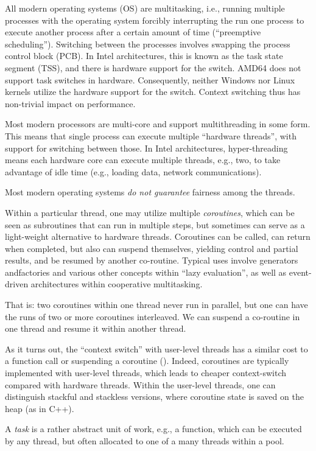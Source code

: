 All modern operating systems (OS) are multitasking, i.e., running multiple processes with the operating system forcibly interrupting the run one process to execute another process after a certain amount of time (``preemptive scheduling''). Switching between the processes involves swapping the process control block (PCB). In Intel architectures, this is known as the task state segment (TSS), and there is hardware support for the switch. AMD64 does not support task switches in hardware.
Consequently, neither Windows nor Linux kernels utilize the hardware support for the switch.
Context switching thus has non-trivial impact on performance. 

Most modern processors are multi-core and support multithreading in some form. This means that single process can execute multiple ``hardware threads'', with support for switching between those. In Intel architectures, hyper-threading means each hardware core can execute multiple threads, e.g., two, to take advantage of idle time (e.g., loading data, network communications).  

Most modern operating systems \emph{do not guarantee} fairness among the threads. 

Within a particular thread, one may utilize multiple \emph{coroutines}, which can be seen as subroutines that can run in multiple steps, but sometimes can serve as a light-weight alternative to hardware threads. Coroutines can be called, can return when completed, but also can suspend themselves, yielding control and partial results, and be resumed by another co-routine. Typical uses involve generators andfactories and various other concepts within ``lazy evaluation'', as well as event-driven architectures within cooperative multitasking. 

That is: two coroutines within one thread never run in parallel, but one can have the runs of two or more coroutines interleaved. We can suspend a co-routine in one thread and resume it within another thread. 

As it turns out, the ``context switch'' with user-level threads has a similar cost to a function call or suspending a coroutine (). Indeed, coroutines are typically implemented with user-level threads, which leads to cheaper context-switch compared with hardware threads. Within the user-level threads, one can distinguish stackful and stackless versions, where coroutine state is saved on the heap (as in C++). 

A \emph{task} is a rather abstract unit of work, e.g., a function, which can be executed by any thread, but often allocated to one of a many threads within a pool. 


